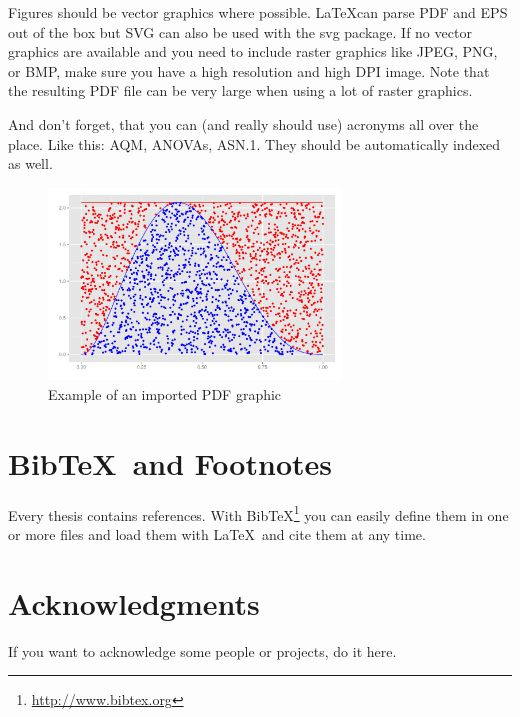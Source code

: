 \documentclass[masterthesis, english]{mas-thesis-chapters} %
\begin{document}
Figures should be vector graphics where possible. \LaTeX can parse PDF and EPS out of the box but SVG can also be used with the svg package. If no vector graphics are available and you need to include raster graphics like JPEG, PNG, or BMP, make sure you have a high resolution and high DPI image. Note that the resulting PDF file can be very large when using a lot of raster graphics.

And don't forget, that you can (and really should use) acronyms all over the place. Like this: \gls{AQM}, \glspl{ANOVA}, \acrshort{ASN.1}. They should be automatically indexed as well.

\begin{figure}[ht]
	\centering
	\includegraphics[height=5.1cm]{graphics/demo-graphic.pdf}
	\caption{Example of an imported PDF graphic}
	\label{figure:1}
\end{figure}



\chapter{Bib\TeX\ and Footnotes}

Every thesis contains references. With Bib\TeX\footnote{\url{http://www.bibtex.org}} you can easily define them in one or more files and load them with \LaTeX\ and cite them at any time.\cite{exampleBook}



\chapter*{Acknowledgments}

If you want to acknowledge some people or projects, do it here.



\cleardoublepage
\affidavit


\printbibliography[heading=bibintoc]
\end{document}
